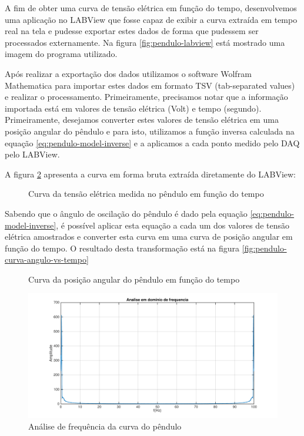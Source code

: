 \documentclass[12pt,a4paper]{instrumentacao}
\begin{document}
A fim de obter uma curva de tensão elétrica em função do tempo, desenvolvemos uma aplicação no LABView que fosse capaz de exibir a curva extraída em tempo real na tela e pudesse exportar estes dados de forma que pudessem ser processados externamente. Na figura \ref{fig:pendulo-labview} está mostrado uma imagem do programa utilizado.


Após realizar a exportação dos dados utilizamos o software Wolfram Mathematica para importar estes dados em formato TSV (tab-separated values) e realizar o processamento. Primeiramente, precisamos notar que a informação importada está em valores de tensão elétrica (Volt) e tempo (segundo). Primeiramente, desejamos converter estes valores de tensão elétrica em uma posição angular do pêndulo e para isto, utilizamos a função inversa calculada na equação \ref{eq:pendulo-model-inverse} e a aplicamos a cada ponto medido pelo DAQ pelo LABView. 

A figura \ref{fig:pendulo-curva-tensao-vs-tempo} apresenta a curva em forma bruta extraída diretamente do LABView:

\begin{figure}[H]
\caption{Curva da tensão elétrica medida no pêndulo em função do tempo}
\label{fig:pendulo-curva-tensao-vs-tempo}
\end{figure}

Sabendo que o ângulo de oscilação do pêndulo é dado pela equação \ref{eq:pendulo-model-inverse}, é possível aplicar esta equação a cada um dos valores de tensão elétrica amostrados e converter esta curva em uma curva de posição angular em função do tempo. O resultado desta transformação está na figura \ref{fig:pendulo-curva-angulo-vs-tempo}

\begin{figure}[H]
\caption{Curva da posição angular do pêndulo em função do tempo}
\label{fig:pendulo-curva-tensao-vs-tempo}
\end{figure}

\begin{figure}[H]
\centering
\includegraphics[width=\textwidth]{frequency-plot.pdf}
\caption{Análise de frequência da curva do pêndulo}
\label{fig:pendulo-frequencia}
\end{figure}
\end{document}
